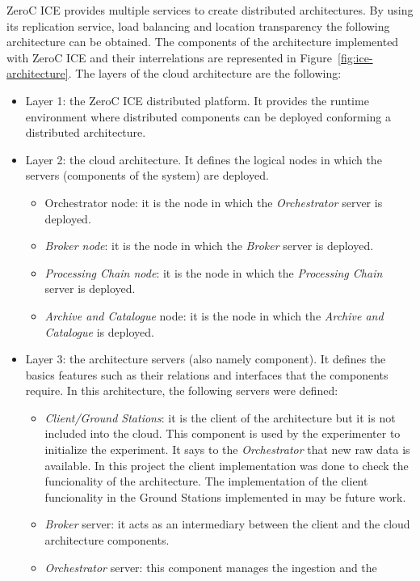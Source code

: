 ZeroC ICE provides multiple services to create distributed
architectures. By using its replication service, load balancing and location
transparency the following architecture can be obtained.
The components of the architecture implemented with ZeroC ICE and their
interrelations are represented in Figure~\ref{fig:ice-architecture}. The layers
of the cloud architecture are the
following:
\begin{itemize}
\item Layer 1: the ZeroC ICE distributed platform. It provides the runtime environment
  where distributed components can be deployed conforming a distributed
  architecture.
\item Layer 2: the cloud architecture. It defines the logical nodes in which the
  servers (components of the system) are deployed.
\begin{itemize}
\item Orchestrator node: it is the node in which the \emph{Orchestrator} server
  is deployed.
\item \emph{Broker node}: it is the node in which the \emph{Broker} server is
  deployed.
\item \emph{Processing Chain node}: it is the node in which the \emph{Processing
  Chain} server is deployed.
\item \emph{Archive and Catalogue} node: it is the node in which the
  \emph{Archive and Catalogue} is deployed.
\end{itemize}
\item Layer 3: the architecture servers (also namely component). It defines the basics features such
  as their relations and interfaces that the components require. In this architecture, the following servers were defined:
\begin{itemize}
\item \emph{Client/Ground Stations}: it is the client of the architecture but it
  is not included into the cloud. This component is used by the experimenter to
  initialize the experiment. It says to the \emph{Orchestrator} that new raw data is available. In this
  project the client implementation was done to check the funcionality of the
  architecture. The implementation of the client
  funcionality in the Ground Stations implemented in \vw may be future work.
\item \emph{Broker} server: it acts as an intermediary between the client and the cloud architecture
  components. 
\item \emph{Orchestrator} server: this component manages the ingestion and the

\end{itemize}
\end{itemize}
